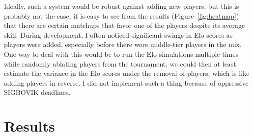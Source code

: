 \documentclass[10pt,preprint,twocolumn]{acmart}
\begin{document}
Ideally, such a system would be robust against adding new players, but
this is probably not the case; it is easy to see from the results
(Figure~\ref{fig:heatmap}) that there are certain matchups that favor
one of the players despite its average skill. During development, I
often noticed significant swings in Elo scores as players were added,
especially before there were middle-tier players in the mix. One way
to deal with this would be to run the Elo simulations multiple times
while randomly ablating players from the tournament; we could then at
least estimate the variance in the Elo scores under the removal of
players, which is like adding players in reverse. I did not implement
such a thing because of oppressive SIGBOVIK deadlines.


\section{Results} \label{sec:results}
\end{document}
